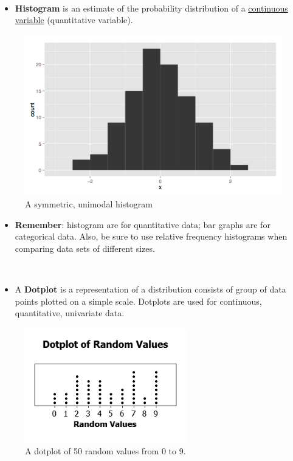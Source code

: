 \documentclass[Main.tex]{subfiles}
\begin{document}
	\begin{example}[Histogram] \hfill \\
		
		\begin{itemize}
			\item \textbf{Histogram} is an estimate of the probability distribution of a \underline{continuous variable} (quantitative variable).
		\end{itemize}
		\begin{figure}[H]
			\centering
			\includegraphics[height=7cm,width=12cm]{Histogram}
			\caption{A symmetric, unimodal histogram}
			\label{Histogram}
		\end{figure}

		\begin{itemize}
		\item \textbf{Remember}: histogram are for quantitative data; bar graphs are for categorical data. Also, be sure to use relative frequency histograms when comparing data sets of different sizes.
		\end{itemize}
	\end{example}

	\begin{example}[Dotplot] \hfill \\
		
		\begin{itemize}
			\item A \textbf{Dotplot} is a representation of a distribution consists of group of data points plotted on a simple scale. Dotplots are used for continuous, quantitative, univariate data.
		\end{itemize}
	
		\begin{figure}[H]
			\centering
			\includegraphics[height=5cm,width=7cm]{Dotplot}
			\caption{A dotplot of 50 random values from 0 to 9.}
			\label{dotplot}
		\end{figure}		
	\end{example}
\end{document}
